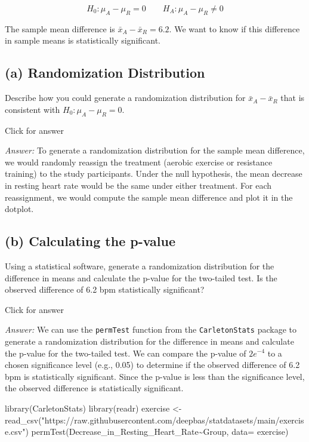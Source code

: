 \documentclass[
]{book}
\newenvironment{Shaded}{\begin{snugshade}}{\end{snugshade}}
\newcommand{\AttributeTok}[1]{\textcolor[rgb]{0.77,0.63,0.00}{#1}}
\newcommand{\FunctionTok}[1]{\textcolor[rgb]{0.00,0.00,0.00}{#1}}
\newcommand{\NormalTok}[1]{#1}
\newcommand{\OtherTok}[1]{\textcolor[rgb]{0.56,0.35,0.01}{#1}}
\newcommand{\SpecialCharTok}[1]{\textcolor[rgb]{0.00,0.00,0.00}{#1}}
\newcommand{\StringTok}[1]{\textcolor[rgb]{0.31,0.60,0.02}{#1}}
\begin{document}
\[H_0: \mu_A-\mu_R=0 \quad\quad H_A: \mu_A-\mu_R \neq 0\]

The sample mean difference is \(\bar{x}_A - \bar{x}_R = 6.2\). We want to know if this difference in sample means is statistically significant.

\hypertarget{a-randomization-distribution}{%
\subsection{(a) Randomization Distribution}\label{a-randomization-distribution}}

Describe how you could generate a randomization distribution for \(\bar{x}_A - \bar{x}_R\) that is consistent with \(H_0: \mu_A - \mu_R = 0\).

Click for answer

\emph{Answer:} To generate a randomization distribution for the sample mean difference, we would randomly reassign the treatment (aerobic exercise or resistance training) to the study participants. Under the null hypothesis, the mean decrease in resting heart rate would be the same under either treatment. For each reassignment, we would compute the sample mean difference and plot it in the dotplot.

\hypertarget{b-calculating-the-p-value}{%
\subsection{(b) Calculating the p-value}\label{b-calculating-the-p-value}}

Using a statistical software, generate a randomization distribution for the difference in means and calculate the p-value for the two-tailed test. Is the observed difference of 6.2 bpm statistically significant?

Click for answer

\emph{Answer:} We can use the \texttt{permTest} function from the \texttt{CarletonStats} package to generate a randomization distribution for the difference in means and calculate the p-value for the two-tailed test. We can compare the p-value of \(2e^{-4}\) to a chosen significance level (e.g., 0.05) to determine if the observed difference of 6.2 bpm is statistically significant. Since the p-value is less than the significance level, the observed difference is statistically significant.

\begin{Shaded}
\begin{Highlighting}[]
\FunctionTok{library}\NormalTok{(CarletonStats)}
\FunctionTok{library}\NormalTok{(readr)}
\NormalTok{exercise }\OtherTok{\textless{}{-}} \FunctionTok{read\_csv}\NormalTok{(}\StringTok{"https://raw.githubusercontent.com/deepbas/statdatasets/main/exercise.csv"}\NormalTok{)}
\FunctionTok{permTest}\NormalTok{(Decrease\_in\_Resting\_Heart\_Rate}\SpecialCharTok{\textasciitilde{}}\NormalTok{Group, }\AttributeTok{data=}\NormalTok{ exercise)}
\end{Highlighting}
\end{Shaded}
\end{document}
